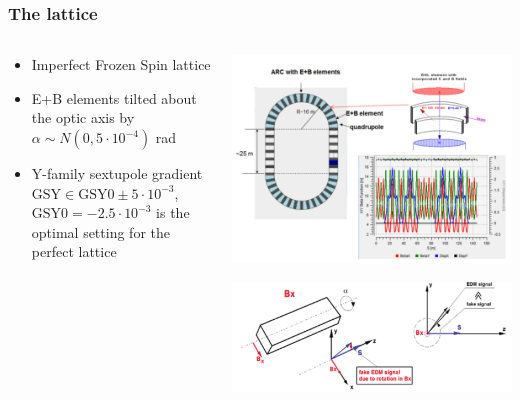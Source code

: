 \documentclass{beamer}
\begin{document}
\begin{frame}\frametitle{The lattice}
  \begin{columns}
    \begin{column}{.5\textwidth}
      \begin{itemize}
      \item Imperfect Frozen Spin lattice
      \item E+B elements tilted about the optic axis by $\alpha\sim N(0, 5\cdot 10^{-4})$ rad
      \item Y-family sextupole gradient $\mathrm{GSY}\in \mathrm{GSY0} \pm 5\cdot 10^{-3}$, $\mathrm{GSY0}=-2.5\cdot10^{-3}$ is the optimal setting for the perfect lattice
      \end{itemize}
    \end{column}
    \begin{column}{.5\textwidth}
      \begin{center}
        \includegraphics[width=\linewidth]{../PhD/img/spin_axis_motion/presentation/lattice}
        
        \includegraphics[width=\linewidth]{magnet_tilting}
      \end{center}
    \end{column}
  \end{columns}
\end{frame}
\end{document}
